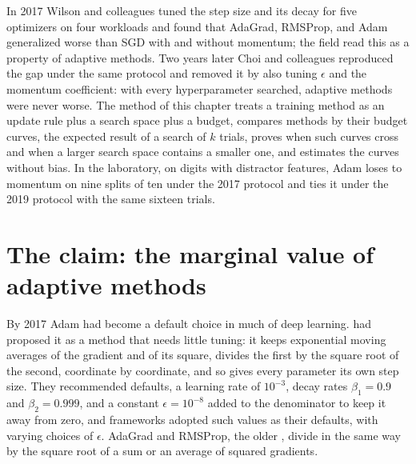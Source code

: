 \begin{refsection}


\begin{chaptersummary}
In 2017 Wilson and colleagues tuned the step size and its decay for five optimizers on four workloads and found that AdaGrad, RMSProp, and Adam generalized worse than SGD with and without momentum; the field read this as a property of adaptive methods. Two years later Choi and colleagues reproduced the gap under the same protocol and removed it by also tuning $\epsilon$ and the momentum coefficient: with every hyperparameter searched, adaptive methods were never worse. The method of this chapter treats a training method as an update rule plus a search space plus a budget, compares methods by their budget curves, the expected result of a search of $k$ trials, proves when such curves cross and when a larger search space contains a smaller one, and estimates the curves without bias. In the laboratory, on digits with distractor features, Adam loses to momentum on nine splits of ten under the 2017 protocol and ties it under the 2019 protocol with the same sixteen trials.
\end{chaptersummary}

\section{The claim: the marginal value of adaptive methods}\label{sec:budgets:claim}

By 2017 Adam had become a default choice in much of deep learning. \Textcite{KingmaBa2015} had proposed it as a method that needs little tuning: it keeps exponential moving averages of the gradient and of its square, divides the first by the square root of the second, coordinate by coordinate, and so gives every parameter its own step size. They recommended defaults, a learning rate of $10^{-3}$, decay rates $\beta_1=0.9$ and $\beta_2=0.999$, and a constant $\epsilon=10^{-8}$ added to the denominator to keep it away from zero, and frameworks adopted such values as their defaults, with varying choices of $\epsilon$. AdaGrad and RMSProp, the older , divide in the same way by the square root of a sum or an average of squared gradients.


\end{refsection}
